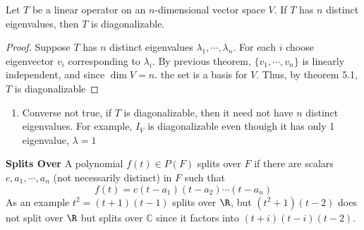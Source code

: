 \documentclass[11pt]{article}
\begin{document}
\begin{corollary*}
    Let $T$ be a linear operator on an $n$-dimensional vector space $V$. If $T$ has $n$ distinct eigenvalues, then $T$ is diagonalizable. 
    \begin{proof}
        Suppose $T$ has $n$ distinct eigenvalues $\lambda_1, \cdots, \lambda_n$. For each $i$ choose eigenvector $v_i$ corresponding to $\lambda_i$. By previous theorem, $\{v_1, \cdots, v_n\}$ is linearly independent, and since $\dim{V} = n$. the set is a basis for $V$. Thus, by theorem 5.1, $T$ is diagonalizable
    \end{proof}
    \begin{enumerate}
        \item Converse not true, if $T$ is diagonalizable, then it need not have $n$ distinct eigenvalues. For example, $I_V$ is diagonalizable even thouigh it has only 1 eigenvalue, $\lambda=1$
    \end{enumerate}
\end{corollary*}



\begin{defn*}
    \textbf{Splits Over} A polynomial $f(t) \in P(F)$ splits over $F$ if there are scalars $c,a_1,\cdots, a_n$ (not necessarily distinct) in $F$ such that 
    \[
        f(t) = c(t-a_1)(t-a_2)\cdots (t-a_n)    
    \]
    As an example $t^2=(t+1)(t-1)$ splits over $\R$, but $(t^2+1)(t-2)$ does not split over $\R$ but splits over $\mathbb{C}$ since it factors into $(t+i)(t-i)(t-2)$. 
\end{defn*}
\end{document}
